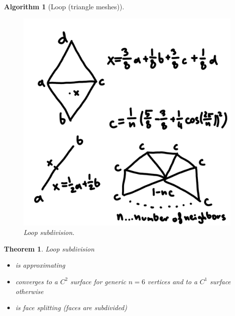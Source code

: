 \documentclass[]{article}
\newtheorem{theorem}{Theorem}
\newtheorem{algorithm}{Algorithm}
\begin{document}
\begin{algorithm}[Loop (triangle meshes)]
	\begin{figure}[h!]
		\centering
		\includegraphics[width=0.3\linewidth]{figures/loop}
		\caption{Loop subdivision.}
		\label{fig:loop}
	\end{figure}
\end{algorithm}

\begin{theorem}
	Loop subdivision
	\begin{itemize}
		\item is approximating
		\item converges to a $C^2$ surface for generic $n=6$ vertices and to a $C^1$ surface otherwise
		\item is face splitting (faces are subdivided)
	\end{itemize}
\end{theorem}
\end{document}
